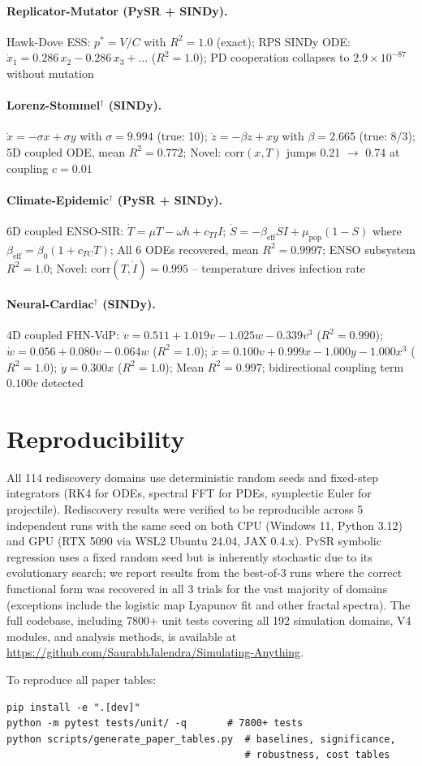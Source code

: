 \documentclass{article}
\newcommand{\pysr}{\textsc{PySR}}
\begin{document}
\paragraph{Replicator-Mutator (PySR + SINDy).}
Hawk-Dove ESS: $p^* = V/C$ with $R^2 = 1.0$ (exact);\quad
RPS SINDy ODE: $\dot{x}_1 = 0.286\,x_2 - 0.286\,x_3 + \ldots$ ($R^2 = 1.0$);\quad
PD cooperation collapses to $2.9 \times 10^{-87}$ without mutation

\paragraph{Lorenz-Stommel$^\dagger$ (SINDy).}
$\dot{x} = -\sigma x + \sigma y$ with $\sigma = 9.994$ (true: 10);\quad
$\dot{z} = -\beta z + xy$ with $\beta = 2.665$ (true: 8/3);\quad
5D coupled ODE, mean $R^2 = 0.772$;\quad
Novel: corr$(x, T)$ jumps 0.21 $\to$ 0.74 at coupling $c = 0.01$

\paragraph{Climate-Epidemic$^\dagger$ (PySR + SINDy).}
6D coupled ENSO-SIR: $\dot{T} = \mu T - \omega h + c_{TI} I$;\quad
$\dot{S} = -\beta_\text{eff} S I + \mu_\text{pop}(1-S)$ where
$\beta_\text{eff} = \beta_0(1 + c_{TC} T)$;\quad
All 6 ODEs recovered, mean $R^2 = 0.9997$;\quad
ENSO subsystem $R^2 = 1.0$;\quad
Novel: corr$(T, \dot{I}) = 0.995$ -- temperature drives infection rate

\paragraph{Neural-Cardiac$^\dagger$ (SINDy).}
4D coupled FHN-VdP:\quad
$\dot{v} = 0.511 + 1.019v - 1.025w - 0.339v^3$ ($R^2 = 0.990$);\quad
$\dot{w} = 0.056 + 0.080v - 0.064w$ ($R^2 = 1.0$);\quad
$\dot{x} = 0.100v + 0.999x - 1.000y - 1.000x^3$ ($R^2 = 1.0$);\quad
$\dot{y} = 0.300x$ ($R^2 = 1.0$);\quad
Mean $R^2 = 0.997$; bidirectional coupling term $0.100v$ detected

\section{Reproducibility}
\label{app:reproducibility}

All 114 rediscovery domains use deterministic random seeds and fixed-step
integrators (RK4 for ODEs, spectral FFT for PDEs, symplectic Euler for
projectile). Rediscovery results were verified to be reproducible
across 5 independent runs with the same seed on both CPU (Windows 11,
Python 3.12) and GPU (RTX 5090 via WSL2 Ubuntu 24.04, JAX 0.4.x).
\pysr{} symbolic regression uses a fixed random seed but is inherently
stochastic due to its evolutionary search; we report results from the
best-of-3 runs where the correct functional form was recovered in all
3 trials for the vast majority of domains (exceptions include the
logistic map Lyapunov fit and other fractal spectra).
The full codebase, including 7800+ unit tests covering all 192 simulation
domains, V4 modules, and analysis methods, is available at
\url{https://github.com/SaurabhJalendra/Simulating-Anything}.

To reproduce all paper tables:
\begin{verbatim}
pip install -e ".[dev]"
python -m pytest tests/unit/ -q       # 7800+ tests
python scripts/generate_paper_tables.py  # baselines, significance,
                                         # robustness, cost tables
\end{verbatim}
\end{document}
